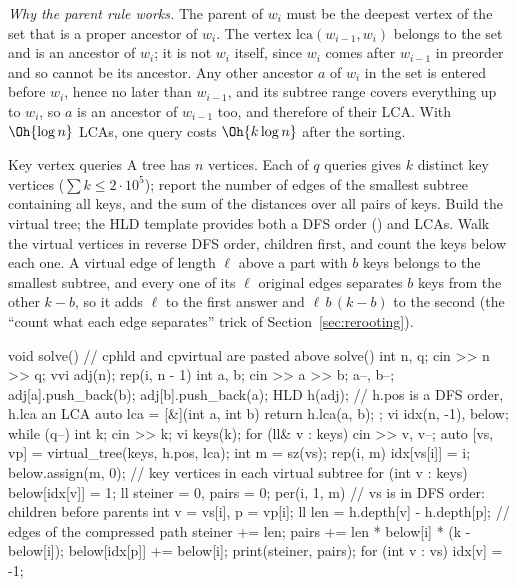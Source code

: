 \emph{Why the parent rule works.} The parent of $w_i$ must be the deepest vertex of the set that is a proper ancestor of $w_i$.
The vertex $\mathrm{lca}(w_{i-1}, w_i)$ belongs to the set and is an ancestor of $w_i$; it is not $w_i$ itself, since $w_i$ comes
after $w_{i-1}$ in preorder and so cannot be its ancestor. Any other ancestor $a$ of $w_i$ in the set is entered before $w_i$,
hence no later than $w_{i-1}$, and its subtree range covers everything up to $w_i$, so $a$ is an ancestor of $w_{i-1}$ too, and
therefore of their LCA. With $\Oh{\log n}$ LCAs, one query costs $\Oh{k \log n}$ after the sorting.

\begin{problem}{Key vertex queries}
A tree has $n$ vertices. Each of $q$ queries gives $k$ distinct key vertices ($\sum k \le 2 \cdot 10^5$); report the number of
edges of the smallest subtree containing all keys, and the sum of the distances over all pairs of keys.
\solution Build the virtual tree; the HLD template provides both a DFS order () and LCAs. Walk the virtual vertices in
reverse DFS order, children first, and count the keys below each one. A virtual edge of length $\ell$ above a part with $b$ keys
belongs to the smallest subtree, and every one of its $\ell$ original edges separates $b$ keys from the other $k - b$, so it adds
$\ell$ to the first answer and $\ell\, b\, (k - b)$ to the second (the ``count what each edge separates'' trick of
Section~\ref{sec:rerooting}).
\end{problem}

\begin{code}
void solve() {  // cphld and cpvirtual are pasted above solve()
    int n, q;
    cin >> n >> q;
    vvi adj(n);
    rep(i, n - 1) {
        int a, b;
        cin >> a >> b;
        a--, b--;
        adj[a].push_back(b);
        adj[b].push_back(a);
    }
    HLD h(adj);  // h.pos is a DFS order, h.lca an LCA
    auto lca = [&](int a, int b) { return h.lca(a, b); };
    vi idx(n, -1), below;
    while (q--) {
        int k;
        cin >> k;
        vi keys(k);
        for (ll& v : keys) cin >> v, v--;
        auto [vs, vp] = virtual_tree(keys, h.pos, lca);
        int m = sz(vs);
        rep(i, m) idx[vs[i]] = i;
        below.assign(m, 0);  // key vertices in each virtual subtree
        for (int v : keys) below[idx[v]] = 1;
        ll steiner = 0, pairs = 0;
        per(i, 1, m) {  // vs is in DFS order: children before parents
            int v = vs[i], p = vp[i];
            ll len = h.depth[v] - h.depth[p];  // edges of the compressed path
            steiner += len;
            pairs += len * below[i] * (k - below[i]);
            below[idx[p]] += below[i];
        }
        print(steiner, pairs);
        for (int v : vs) idx[v] = -1;
    }
}
\end{code}

